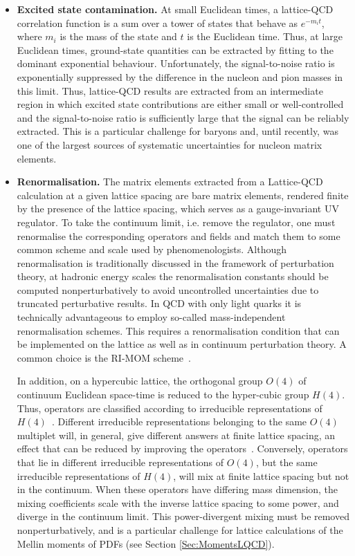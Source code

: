 \begin{itemize}
\item {\bfseries Excited state contamination.} At small Euclidean times, a lattice-QCD correlation function
is a sum over a tower of states that behave as $e^{-m_it}$, where $m_i$ is the 
mass of the state and $t$ is the Euclidean time. Thus, at large Euclidean times,
ground-state quantities can be extracted by fitting to the dominant exponential behaviour.
Unfortunately, the signal-to-noise ratio
is exponentially suppressed by the difference in the nucleon and pion masses in this limit. Thus, lattice-QCD results
are extracted from an intermediate region in which excited state contributions are 
either small or well-controlled and the signal-to-noise ratio is sufficiently large that
the signal can be reliably extracted. This is a particular challenge for baryons and,
until recently, was one of the largest sources of systematic uncertainties for
nucleon matrix elements.

\item {\bfseries Renormalisation.} The matrix elements extracted from a 
Lattice-QCD calculation at a given lattice spacing are bare matrix elements,
rendered finite by the presence of the lattice spacing, which serves
as a gauge-invariant UV regulator. To take the continuum limit,
i.e. remove the regulator, one must renormalise the corresponding
operators and fields and match them to some common scheme and scale used 
by phenomenologists. Although renormalisation is traditionally
discussed in the framework of perturbation theory, at hadronic energy
scales the renormalisation constants should be computed
nonperturbatively to avoid uncontrolled uncertainties due to 
truncated perturbative results. In QCD with only light quarks it is technically
advantageous to employ so-called mass-independent renormalisation
schemes. This requires a renormalisation condition that can be
implemented on the lattice as well as in continuum perturbation
theory. A common choice is the RI-MOM scheme~\cite{Martinelli:1994ty}.

In addition, on a hypercubic lattice, the orthogonal group $O(4)$ of
continuum Euclidean space-time is reduced to the hyper-cubic group
$H(4)$. Thus, operators are classified according to irreducible
representations of $H(4)$~\cite{Gockeler:1996mu}. Different
irreducible representations belonging to the same $O(4)$ multiplet
will, in general, give different answers at finite lattice spacing, an
effect that can be reduced by improving the
operators~\cite{Gockeler:2004wp}. Conversely, operators that lie in
different irreducible representations of $O(4)$, but the same irreducible
representations of $H(4)$, will mix at finite lattice spacing but not
in the continuum. When these operators have differing mass dimension,
the mixing coefficients scale with the inverse lattice spacing to some
power, and diverge in the continuum limit. This power-divergent mixing
must be removed nonperturbatively, and is a particular challenge for
lattice calculations of the Mellin moments of PDFs (see
Section \ref{Sec:MomentsLQCD}).


\end{itemize}
